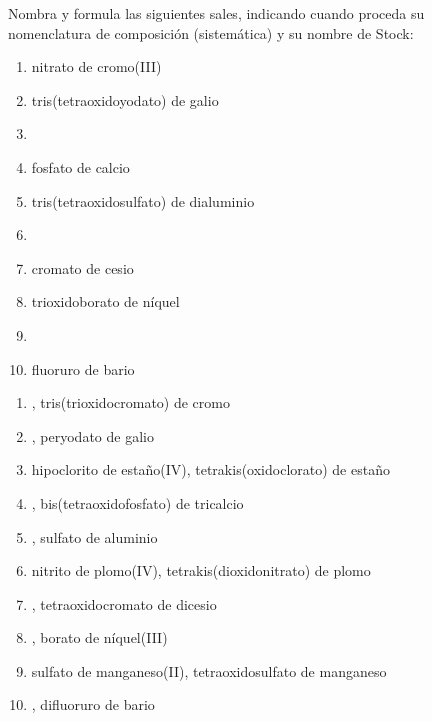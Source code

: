 \documentclass[10pt,a5paper,twoside]{article}
\begin{document}
\begin{exercise}[
    tags    = {inorgánica,sales, sales binarias,sales ternarias},
    topics  = {química inorgánica,formulación,nomenclatura},
    source  = {SAN Formulación, p29, e38},
  ]
  Nombra y formula las siguientes sales, indicando cuando proceda su nomenclatura de composición (sistemática) y su nombre de Stock:

  \begin{enumerate}
    \item nitrato de cromo(III)
    \item tris(tetraoxidoyodato) de galio
    \item {}
    \item fosfato de calcio
    \item tris(tetraoxidosulfato) de dialuminio
    \item {}
    \item cromato de cesio
    \item trioxidoborato de níquel
    \item {}
    \item fluoruro de bario
  \end{enumerate}
\end{exercise}

\begin{solution}
  \begin{enumerate}
    \item {}, tris(trioxidocromato) de cromo
    \item {}, peryodato de galio
    \item hipoclorito de estaño(IV), tetrakis(oxidoclorato) de estaño
    \item {}, bis(tetraoxidofosfato) de tricalcio
    \item {}, sulfato de aluminio
    \item nitrito de plomo(IV), tetrakis(dioxidonitrato) de plomo
    \item {}, tetraoxidocromato de dicesio
    \item {}, borato de níquel(III)
    \item sulfato de manganeso(II), tetraoxidosulfato de manganeso
    \item {}, difluoruro de bario
  \end{enumerate}
\end{solution}
\end{document}
